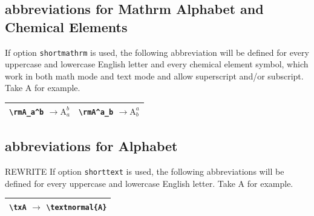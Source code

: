 \documentclass[a4paper,12pt]{article}
\begin{document}
\subsection{abbreviations for Mathrm Alphabet and Chemical Elements}
If option \texttt{shortmathrm} is used, the following abbreviation will be defined for every uppercase and lowercase English letter and every chemical element symbol, which work in both math mode and text mode and allow superscript and/or subscript. Take A for example.
\begin{longtable}[c]{|p{}|p{}|}
\hline
\verb|\rmA_a^b| $\rightarrow\mathrm{A}_a^b$ & \verb|\rmA^a_b| $\rightarrow\mathrm{A}^a_b$ \\\hline
\end{longtable}
\subsection{abbreviations for Alphabet}
REWRITE
If option \texttt{shorttext} is used, the following abbreviations will be defined for every uppercase and lowercase English letter. Take A for example.
\begin{longtable}[c]{|c|}
\hline
\verb|\txA| $\rightarrow$ \verb|\textnormal{A}|
\\\hline
\end{longtable}
\end{document}
